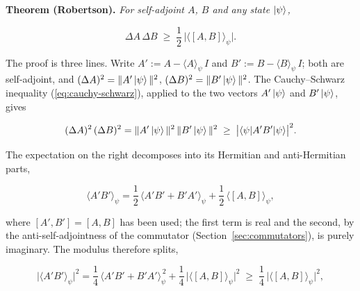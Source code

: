 \textbf{Theorem (Robertson).} \emph{For self-adjoint $A$, $B$ and any state $\ket{\psi}$,}
\begin{linenomath}
    \begin{equation}
        \Delta A\,\Delta B \;\geq\; \frac{1}{2}\,\bigl|\langle[A,B]\rangle_\psi\bigr| .
        \label{eq:robertson}
    \end{equation}
\end{linenomath}
The proof is three lines. Write $A' := A - \langle A\rangle_\psi\,I$ and $B' := B - \langle B\rangle_\psi\,I$; both are self-adjoint, and $(\Delta A)^2 = \|A'\ket{\psi}\|^2$, $(\Delta B)^2 = \|B'\ket{\psi}\|^2$. The Cauchy--Schwarz inequality (\eqref{eq:cauchy-schwarz}), applied to the two vectors $A'\ket{\psi}$ and $B'\ket{\psi}$, gives
\begin{linenomath}
    \begin{equation}
        (\Delta A)^2\,(\Delta B)^2
        = \|A'\ket{\psi}\|^2\,\|B'\ket{\psi}\|^2
        \;\geq\; \bigl|\braket{\psi|A'B'|\psi}\bigr|^2 .
    \end{equation}
\end{linenomath}
The expectation on the right decomposes into its Hermitian and anti-Hermitian parts,
\begin{linenomath}
    \begin{equation}
        \langle A'B'\rangle_\psi
        = \frac{1}{2}\,\bigl\langle A'B' + B'A' \bigr\rangle_\psi
        + \frac{1}{2}\,\bigl\langle [A,B] \bigr\rangle_\psi ,
    \end{equation}
\end{linenomath}
where $[A',B'] = [A,B]$ has been used; the first term is real and the second, by the anti-self-adjointness of the commutator (Section~\ref{sec:commutators}), is purely imaginary. The modulus therefore splits,
\begin{linenomath}
    \begin{equation}
        \bigl|\langle A'B'\rangle_\psi\bigr|^2
        = \frac{1}{4}\,\bigl\langle A'B' + B'A' \bigr\rangle_\psi^{\,2}
        + \frac{1}{4}\,\bigl|\langle[A,B]\rangle_\psi\bigr|^2
        \;\geq\; \frac{1}{4}\,\bigl|\langle[A,B]\rangle_\psi\bigr|^2 ,
    \end{equation}
\end{linenomath}
